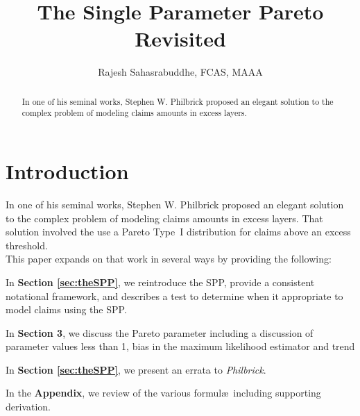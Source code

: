 \documentclass[]{article} %
\title{The Single Parameter Pareto Revisited}
\author{Rajesh Sahasrabuddhe, FCAS, MAAA}
\newcommand{\philbrick}{\textit{Philbrick}}
\begin{document}
\maketitle

\begin{abstract}
In one of his seminal works, Stephen W. Philbrick proposed an elegant solution to the complex problem of modeling claims amounts in excess layers. 

\end{abstract}

\section{Introduction}
In one of his seminal works, Stephen W. Philbrick\cite{Philbrick} proposed an elegant solution to the complex problem of modeling claims amounts in excess layers. That solution involved the use a Pareto Type~I distribution for claims above an excess threshold.\\

This paper expands on that work in several ways by providing the following:
\begin{description}
	\item In \textbf{Section \ref{sec:theSPP}}, we reintroduce the SPP, provide a consistent notational framework, and describes a test to determine when it appropriate to model claims using the SPP.
	\item In \textbf{Section 3}, we discuss the Pareto parameter including a discussion of parameter values less than 1, bias in the maximum likelihood estimator and trend
	\item In \textbf{Section \ref{sec:theSPP}}, we present an errata to \philbrick.
	\item In the \textbf{Appendix}, we review of the various formul\ae~including supporting derivation.
\end{description}

%

%

\end{document}
